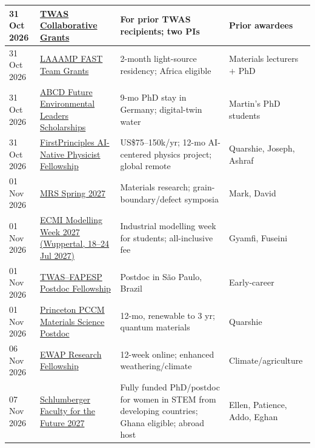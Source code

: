 \begin{longtable}{@{}p{2.0cm}p{4.4cm}p{5.2cm}p{3.0cm}@{}}
\midrule
31 Oct 2026 & \href{https://www.twas.org/opportunity/twas-research-grants-programme-interdisciplinary-research-collaborative-grants}{TWAS Collaborative Grants} & For prior TWAS recipients; two PIs & Prior awardees  \\
\midrule
31 Oct 2026 & \href{https://laamp.iucr.org/grants/calls/jan-dec-2027}{LAAAMP FAST Team Grants} & 2-month light-source residency; Africa eligible & Materials lecturers $+$ PhD  \\
\midrule
31 Oct 2026 & \href{https://opportunityforafrica.org/blog/apply-for-the-abcd-future-environmental-leaders-scholarships-2027-9-month-phd-research-stay-in-germany-for-global-south-scholars/}{ABCD Future Environmental Leaders Scholarships} & 9-mo PhD stay in Germany; digital-twin water & Martin's PhD students  \\
\midrule
31 Oct 2026 & \href{https://www.firstprinciplesfoundation.org/programs}{FirstPrinciples AI-Native Physicist Fellowship} & US\$75--150k/yr; 12-mo AI-centered physics project; global remote & Quarshie, Joseph, Ashraf  \\
\midrule
01 Nov 2026 & \href{https://www.mrs.org/docs/default-source/meetings-events/spring-meetings/2027/s27-call-for-abstracts.pdf}{MRS Spring 2027} & Materials research; grain-boundary/defect symposia & Mark, David  \\
\midrule
01 Nov 2026 & \href{https://ecmimw.uni-wuppertal.de/en}{ECMI Modelling Week 2027 (Wuppertal, 18--24 Jul 2027)} & Industrial modelling week for students; all-inclusive fee & Gyamfi, Fuseini  \\
\midrule
01 Nov 2026 & \href{https://www.twas.org/opportunity/twas-fapesp-postdoctoral-fellowship-programme-developing-countries}{TWAS--FAPESP Postdoc Fellowship} & Postdoc in São Paulo, Brazil & Early-career  \\
\midrule
01 Nov 2026 & \href{https://pccm.princeton.edu/education/postdoc-fellowship}{Princeton PCCM Materials Science Postdoc} & 12-mo, renewable to 3 yr; quantum materials & Quarshie  \\
\midrule
06 Nov 2026 & \href{https://ewap-project.org/fellowship}{EWAP Research Fellowship} & 12-week online; enhanced weathering/climate & Climate/agriculture  \\
\midrule
07 Nov 2026 & \href{https://schlumbergerfoundation.com/apply-now/}{Schlumberger Faculty for the Future 2027} & Fully funded PhD/postdoc for women in STEM from developing countries; Ghana eligible; abroad host & Ellen, Patience, Addo, Eghan  \\

\end{longtable}
